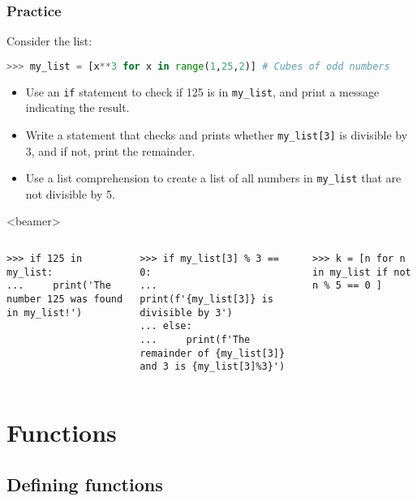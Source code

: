 \begin{frame}[fragile]
  \frametitle{Practice}
  Consider the list:
  \begin{lstlisting}[language=Python, numbers=none]
>>> my_list = [x**3 for x in range(1,25,2)] # Cubes of odd numbers
  \end{lstlisting}  \pause
  \begin{itemize}
  \item Use an \lstinline{if} statement to check if 125 is in \lstinline{my_list}, and print a message indicating the result.
  \item Write a statement that checks and prints whether \lstinline{my_list[3]} is divisible by 3, and if not, print the remainder.
  \item Use a list comprehension to create a list of all numbers in \lstinline|my_list| that are not divisible by 5.
 \end{itemize}\pause
 \begin{onlyenv}<beamer>
  \begin{columns}[T]
    \begin{lstlisting}[]
>>> if 125 in my_list:
...     print('The number 125 was found in my_list!')
    \end{lstlisting}
    \begin{lstlisting}[]
>>> if my_list[3] % 3 == 0:
...     print(f'{my_list[3]} is divisible by 3')
... else:
...     print(f'The remainder of {my_list[3]} and 3 is {my_list[3]%3}')
    \end{lstlisting}
    \begin{lstlisting}
>>> k = [n for n in my_list if not n % 5 == 0 ]
    \end{lstlisting}
  \end{columns}
\end{onlyenv}
\end{frame}

\section{Functions}
\subsection{Defining functions}

